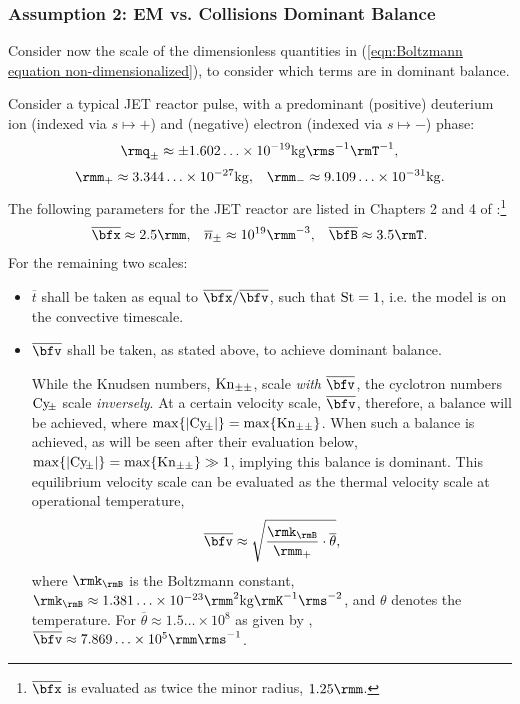 \subsubsection*{Assumption 2: EM vs. Collisions Dominant Balance}
    Consider now the scale of the dimensionless quantities in (\ref{eqn:Boltzmann equation non-dimensionalized}), to consider which terms are in dominant balance.
    
    Consider a typical JET reactor pulse, with a predominant (positive) deuterium ion (indexed via $s  \mapsto  +$) and (negative) electron (indexed via $s  \mapsto  -$) phase:
    \begin{equation}
        \rmq_{\pm}  \approx  \pm 1.602\ldots\times 10^{- 19}{\rm kg}\rms^{- 1}\rmT^{- 1},
    \end{equation}
    \begin{align}
        \rmm_{+}    \approx  3.344\ldots\times 10^{- 27}{\rm kg},  &&
        \rmm_{-}    \approx  9.109\ldots\times 10^{- 31}{\rm kg}.
    \end{align}
    The following parameters for the JET reactor are listed in Chapters 2 and 4 of \cite{Wes00}:\footnote{$\overline{\bfx}$ is evaluated as twice the minor radius, $1.25\rmm$.}
    \begin{align}
        \overline{\bfx}     \approx  2.5\rmm,  &&
        \overline{n}_{\pm}  \approx  10^{19}\rmm^{- 3},  &&
        \overline{\bfB}     \approx  3.5\rmT.
    \end{align}
    For the remaining two scales:
    \begin{itemize}
        \item  $\overline{t}$ shall be taken as equal to $\overline{\bfx}/\overline{\bfv}$, such that $\mathrm{St}  =  1$, i.e. the model is on the convective timescale.

        \item  $\overline{\bfv}$ shall be taken, as stated above, to achieve dominant balance.
        
        While the Knudsen numbers, $\mathrm{Kn}_{\pm\pm}$, scale \emph{with} $\overline{\bfv}$, the cyclotron numbers $\mathrm{Cy}\!_{\pm}$ scale \emph{inversely}. At a certain velocity scale, $\overline{\bfv}$, therefore, a balance will be achieved, where $\max\{|\mathrm{Cy}\!_{\pm}|\}  =  \max\{\mathrm{Kn}_{\pm\pm}\}$. When such a balance is achieved, as will be seen after their evaluation below, $\max\{|\mathrm{Cy}\!_{\pm}|\}  =  \max\{\mathrm{Kn}_{\pm\pm}\}  \gg  1$, implying this balance is dominant. This equilibrium velocity scale can be evaluated as the thermal velocity scale at operational temperature,
        \begin{equation}
            \overline{\bfv}  \approx  \sqrt{\frac{\rmk_{\rmB}}{\rmm_{+}}\cdot\overline{\theta}},
        \end{equation}
        where $\rmk_{\rmB}$ is the Boltzmann constant, $\rmk_{\rmB}  \approx  1.381\ldots\times 10^{- 23}\rmm^{2}{\rm kg}\rmK^{- 1}\rms^{- 2}$, and $\theta$ denotes the temperature. For $\overline{\theta}  \approx  1.5\ldots\times 10^{8}$ as given by \cite{Wes00}, $\overline{\bfv}  \approx  7.869\ldots\times 10^{5}\rmm\rms^{- 1}$. 
    \end{itemize}

